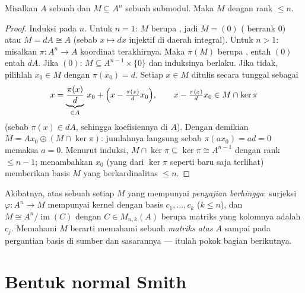\begin{theorem}\label{thm:b3:modules:submodule}
Misalkan $A$ sebuah  dan $M \subseteq A^n$ sebuah submodul. Maka $M$
 dengan rank $\leq n$.
\end{theorem}

\begin{proof}
Induksi pada $n$. Untuk $n = 1$: $M$ berupa , jadi $M = (0)$
( berrank $0$) atau $M = dA \cong A$ (sebab $x \mapsto dx$
injektif di daerah integral). Untuk $n > 1$: misalkan $\pi \colon A^n \to A$
koordinat terakhirnya. Maka $\pi(M)$ berupa , entah $(0)$ entah $dA$. Jika
$(0)$: $M \subseteq A^{n-1} \times \{0\}$ dan induksinya berlaku.
Jika tidak, pilihlah $x_0 \in M$ dengan $\pi(x_0) = d$. Setiap $x \in M$
ditulis secara tunggal sebagai
\[
x = \underbrace{\frac{\pi(x)}{d}}_{\in A}\, x_0 +
\Bigl(x - \tfrac{\pi(x)}d x_0\Bigr),
\qquad x - \tfrac{\pi(x)}d x_0 \in M \cap \ker\pi
\]
(sebab $\pi(x) \in dA$, sehingga koefisiennya di $A$). Dengan demikian $M = Ax_0
\oplus (M \cap \ker \pi)$: jumlahnya langsung sebab $\pi(ax_0) =
ad = 0$ memaksa $a = 0$. Menurut induksi, $M \cap \ker\pi \subseteq
\ker \pi \cong A^{n-1}$  dengan rank $\leq n - 1$; menambahkan
$x_0$ (yang  dari $\ker\pi$ seperti baru saja terlihat) memberikan basis
$M$ yang berkardinalitas $\leq n$.
\end{proof}

\begin{remark}\label{rem:b3:modules:presentation}
Akibatnya, atas sebuah  setiap  $M$ yang  mempunyai
\emph{penyajian berhingga}: surjeksi $\varphi\colon A^n \to M$
mempunyai kernel  dengan basis $c_1, \dots, c_k$ ($k \leq n$), dan $M
\cong A^n / \operatorname{im}(C)$ dengan $C \in M_{n,k}(A)$ berupa
matriks yang kolomnya adalah $c_j$. Memahami $M$ berarti
memahami sebuah \emph{matriks atas $A$} sampai pada pergantian basis di
sumber dan sasarannya --- itulah pokok bagian berikutnya.
\end{remark}

\section{Bentuk normal Smith}

